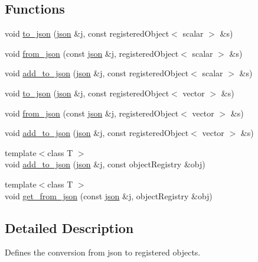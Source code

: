 \subsection*{Functions}
\begin{DoxyCompactItemize}
\item 
void \hyperlink{namespaceFoam_a8f902008c5eedaec2a88f46546efb8d3}{to\+\_\+json} (\hyperlink{dictModifier_8C_ab701e3ac61a85b337ec5c1abaad6742d}{json} \&j, const registered\+Object$<$ scalar $>$ \&s)
\item 
void \hyperlink{namespaceFoam_a13d3dea89b2df135b0f566e278cd4287}{from\+\_\+json} (const \hyperlink{dictModifier_8C_ab701e3ac61a85b337ec5c1abaad6742d}{json} \&j, registered\+Object$<$ scalar $>$ \&s)
\item 
void \hyperlink{namespaceFoam_ab6b994e03fc133ac6c8505123774e803}{add\+\_\+to\+\_\+json} (\hyperlink{dictModifier_8C_ab701e3ac61a85b337ec5c1abaad6742d}{json} \&j, const registered\+Object$<$ scalar $>$ \&s)
\item 
void \hyperlink{namespaceFoam_aaa31b2da863e0a9f79a75f01797f5107}{to\+\_\+json} (\hyperlink{dictModifier_8C_ab701e3ac61a85b337ec5c1abaad6742d}{json} \&j, const registered\+Object$<$ vector $>$ \&s)
\item 
void \hyperlink{namespaceFoam_a520a95b521a147b32c5bbebd6d1c41cf}{from\+\_\+json} (const \hyperlink{dictModifier_8C_ab701e3ac61a85b337ec5c1abaad6742d}{json} \&j, registered\+Object$<$ vector $>$ \&s)
\item 
void \hyperlink{namespaceFoam_a4afc81c4d80dd5e8bfc906bb9a5e00de}{add\+\_\+to\+\_\+json} (\hyperlink{dictModifier_8C_ab701e3ac61a85b337ec5c1abaad6742d}{json} \&j, const registered\+Object$<$ vector $>$ \&s)
\item 
{\footnotesize template$<$class T $>$ }\\void \hyperlink{namespaceFoam_a03317fe9c30acb9bb1849d7437bb900a}{add\+\_\+to\+\_\+json} (\hyperlink{dictModifier_8C_ab701e3ac61a85b337ec5c1abaad6742d}{json} \&j, const object\+Registry \&obj)
\item 
{\footnotesize template$<$class T $>$ }\\void \hyperlink{namespaceFoam_a158ba8737a94de14739f7b9af1d30118}{get\+\_\+from\+\_\+json} (const \hyperlink{dictModifier_8C_ab701e3ac61a85b337ec5c1abaad6742d}{json} \&j, object\+Registry \&obj)
\end{DoxyCompactItemize}


\subsection{Detailed Description}
Defines the conversion from json to registered objects. 

